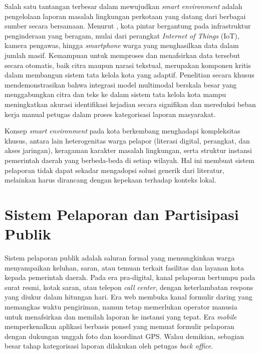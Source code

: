 Salah satu tantangan terbesar dalam mewujudkan \textit{smart environment} adalah pengelolaan laporan masalah lingkungan perkotaan yang datang dari berbagai sumber secara bersamaan. Menurut \citet{sadiqSensingSmartCities2025}, kota pintar bergantung pada infrastruktur penginderaan yang beragam, mulai dari perangkat \textit{Internet of Things} (IoT), kamera pengawas, hingga \textit{smartphone} warga yang menghasilkan data dalam jumlah masif. Kemampuan untuk memproses dan menafsirkan data tersebut secara otomatis, baik citra maupun narasi tekstual, merupakan komponen kritis dalam membangun sistem tata kelola kota yang adaptif. Penelitian \citet{shenSmartCityGovernance2025} secara khusus mendemonstrasikan bahwa integrasi model multimodal berskala besar yang menggabungkan citra dan teks ke dalam sistem tata kelola kota mampu meningkatkan akurasi identifikasi kejadian secara signifikan dan mereduksi beban kerja manual petugas dalam proses kategorisasi laporan masyarakat.

Konsep \textit{smart environment} pada kota berkembang menghadapi kompleksitas khusus, antara lain heterogenitas warga pelapor (literasi digital, perangkat, dan akses jaringan), keragaman karakter masalah lingkungan, serta struktur instansi pemerintah daerah yang berbeda-beda di setiap wilayah. Hal ini membuat sistem pelaporan tidak dapat sekadar mengadopsi solusi generik dari literatur, melainkan harus dirancang dengan kepekaan terhadap konteks lokal.

\section{Sistem Pelaporan dan Partisipasi Publik}
\label{sec:pelaporan}

Sistem pelaporan publik adalah saluran formal yang memungkinkan warga menyampaikan keluhan, saran, atau temuan terkait fasilitas dan layanan kota kepada pemerintah daerah. Pada era pra-digital, kanal pelaporan bertumpu pada surat resmi, kotak saran, atau telepon \textit{call center}, dengan keterlambatan respons yang diukur dalam hitungan hari. Era web membuka kanal formulir daring yang memangkas waktu pengiriman, namun tetap memerlukan operator manusia untuk menafsirkan dan memilah laporan ke instansi yang tepat. Era \textit{mobile} memperkenalkan aplikasi berbasis ponsel yang memuat formulir pelaporan dengan dukungan unggah foto dan koordinat GPS. Walau demikian, sebagian besar tahap kategorisasi laporan dilakukan oleh petugas \textit{back office}.

